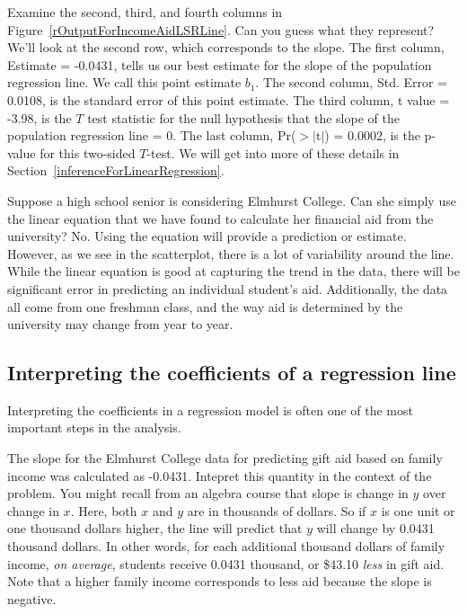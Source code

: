 \begin{examplewrap}
\begin{nexample}{Examine the second, third, and fourth columns in Figure~\ref{rOutputForIncomeAidLSRLine}. Can you guess what they represent?}
We'll look at the second row, which corresponds to the slope.  The first column, Estimate = -0.0431, tells us our best estimate for the slope of the population regression line.  We call this point estimate $b_1$.  The second column, Std. Error = 0.0108, is the standard error of this point estimate. The third column, t value = -3.98, is the $T$ test statistic for the null hypothesis that the slope of the population regression line = 0. The last column, Pr($>$$|$t$|$) = 0.0002, is the p-value for this two-sided $T$-test. We will get into more of these details in Section~\ref{inferenceForLinearRegression}.
\end{nexample}
\end{examplewrap}

\begin{examplewrap}
\begin{nexample}{Suppose a high school senior is considering Elmhurst College. Can she simply use the linear equation that we have found to calculate her financial aid from the university?}
No.  Using the equation will provide a prediction or estimate.  However, as we see in the scatterplot, there is a lot of variability around the line.  While the linear equation is good at capturing the trend in the data, there will be significant error in predicting an individual student's aid.  Additionally, the data all come from one freshman class, and the way aid is determined by the university may change from year to year.
\end{nexample}
\end{examplewrap} 


\subsection{Interpreting the coefficients of a regression line}


Interpreting the coefficients in a regression model is often one of the most important steps in the analysis.

\begin{examplewrap}
\begin{nexample}{The slope for the Elmhurst College data for predicting gift aid based on family income was calculated as -0.0431.  Intepret this quantity in the context of the problem. }
You might recall from an algebra course that slope is change in $y$ over change in $x$.  Here, both $x$ and $y$ are in thousands of dollars.  So if $x$ is one unit or one thousand dollars higher, the line will predict that $y$ will change by 0.0431 thousand dollars.  In other words, for each additional thousand dollars of family income, \emph{on average}, students receive 0.0431 thousand, or \$43.10 \emph{less} in gift aid. Note that a higher family income corresponds to less aid because the slope is negative.   
\end{nexample}
\end{examplewrap}

